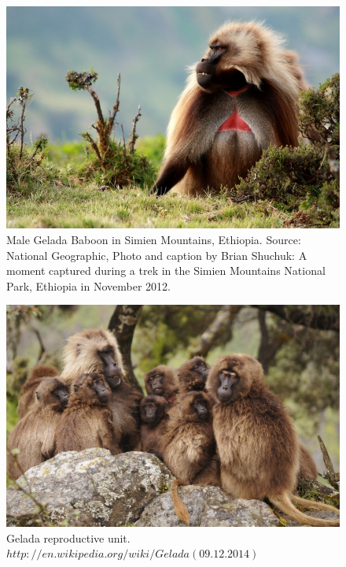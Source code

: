 \documentclass[11pt]{article}
\begin{document}
\begin{figure}[H]
\centering
\includegraphics[scale=0.4]{Photos/NationalGeographic_BrianShuchuk}
\caption[Male gelada baboon]{Male Gelada Baboon in Simien Mountains, Ethiopia.
Source: National Geographic, Photo and caption by Brian Shuchuk: A moment captured during a trek in the Simien Mountains National Park, Ethiopia in November 2012.}
\label{fig:MaleGelada}
\end{figure}


\begin{figure}[H]
\centering
\includegraphics[scale=0.55]{Photos/Gelada_group}
\caption[Gelada reproductive unit]{Gelada reproductive unit. $http://en.wikipedia.org/wiki/Gelada (09.12.2014)$}
\label{fig:GeladaGroup}
\end{figure}
\end{document}
